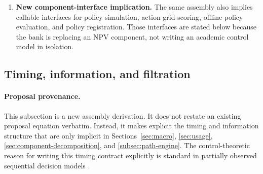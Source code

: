 \documentclass[11pt]{article}
\newcommand{\1}{\mathbf{1}}
\begin{document}
\begin{enumerate}[label=\arabic*.]
        the observation equations, the Bayesian filtering recursion, and the
        constrained belief-state Bellman recursion are new derivations in this
        proposal. They are introduced because the earlier proposal sections name
        the ingredients of a dynamic system but do not yet assemble them into a
        full state-space model.
  \item \textbf{New component-interface implication.} The same assembly also
        implies callable interfaces for policy simulation, action-grid scoring,
        offline policy evaluation, and policy registration. Those interfaces are
        stated below because the bank is replacing an NPV component, not writing
        an academic control model in isolation.
\end{enumerate}

\subsection{Timing, information, and filtration}
\label{subsec:state-space-timing}

\paragraph{Proposal provenance.}
This subsection is a new assembly derivation. It does not restate an existing
proposal equation verbatim. Instead, it makes explicit the timing and
information structure that are only implicit in Sections~\ref{sec:macro},
\ref{sec:usage}, \ref{sec:component-decomposition}, and
\ref{subsec:path-engine}. The control-theoretic reason for writing this timing
contract explicitly is standard in partially observed sequential decision models
\citep{smallwood1973pomdp,kaelbling1998pomdp}.
\end{document}
